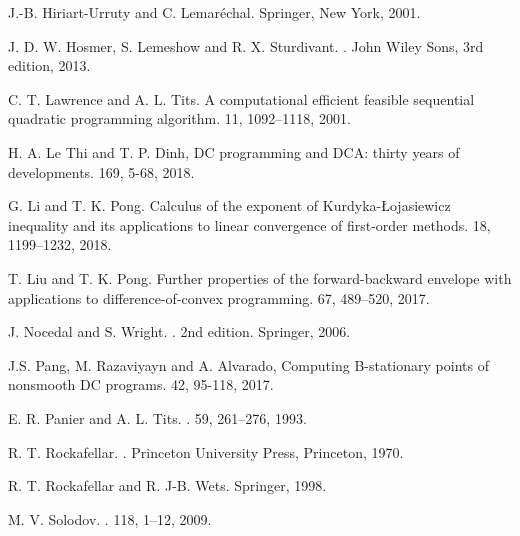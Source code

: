 \documentclass[10pt]{article}
\numberwithin{equation}{section}
\begin{document}
\begin{thebibliography}{99}
J.-B. Hiriart-Urruty and C. Lemar\'{e}chal.
\newblock Springer, New York, 2001.


J. D. W. Hosmer, S. Lemeshow and R. X. Sturdivant.
.
\newblock John Wiley Sons, 3rd edition, 2013.

C. T. Lawrence and A. L. Tits.
\newblock A computational efficient feasible sequential quadratic programming algorithm.
 11, 1092--1118, 2001.

{\color{blue}
\newblock H. A. Le Thi and
T. P. Dinh, DC programming and DCA: thirty years of
developments.
  169, 5-68, 2018.}


G. Li and T. K. Pong.
\newblock Calculus of the exponent of Kurdyka-{\L}ojasiewicz inequality and its applications to linear convergence of first-order methods.
 18, 1199--1232, 2018.

T. Liu and T. K. Pong.
\newblock Further properties of the forward-backward envelope with applications to difference-of-convex programming.
 67, 489--520, 2017.

J. Nocedal and S. Wright.
.
\newblock 2nd edition. Springer, 2006.


{\color{blue}  J.S. Pang, M. Razaviyayn and A. Alvarado,
\newblock Computing B-stationary points of
nonsmooth DC programs.
 42, 95-118, 2017.}

E. R. Panier and A. L. Tits.
.
 59, 261--276, 1993.

R. T. Rockafellar.
.
\newblock Princeton University Press, Princeton, 1970.

R. T. Rockafellar and R. J-B. Wets.
\newblock Springer, 1998.

M. V. Solodov.
.
 118, 1--12, 2009.


\end{thebibliography}
\end{document}
